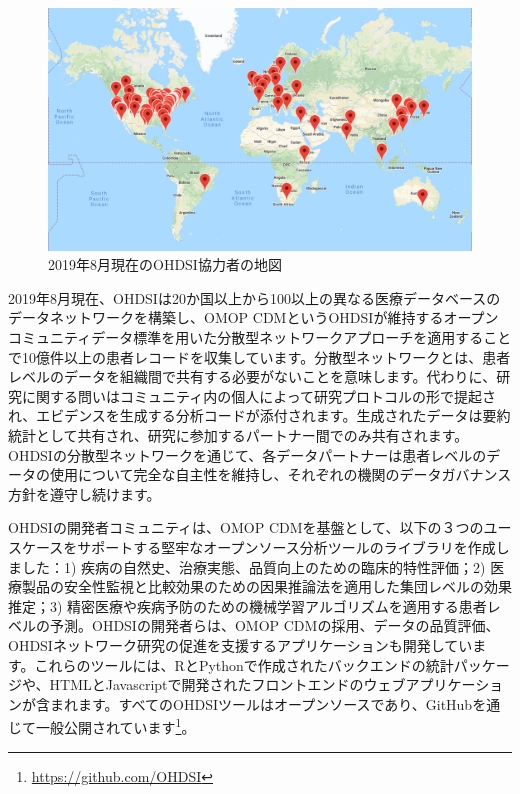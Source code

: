 \documentclass[
  11pt]{book}
\theoremstyle{definition}
\theoremstyle{definition}
\theoremstyle{definition}
\theoremstyle{definition}
\theoremstyle{remark}
\begin{document}
\begin{figure}

{\centering \includegraphics[width=1\linewidth]{images/OhdsiCommunity/mapOfCollaborators} 

}

\caption{2019年8月現在のOHDSI協力者の地図}\label{fig:collaboratormap}
\end{figure}

2019年8月現在、OHDSIは20か国以上から100以上の異なる医療データベースのデータネットワークを構築し、OMOP CDMというOHDSIが維持するオープンコミュニティデータ標準を用いた分散型ネットワークアプローチを適用することで10億件以上の患者レコードを収集しています。分散型ネットワークとは、患者レベルのデータを組織間で共有する必要がないことを意味します。代わりに、研究に関する問いはコミュニティ内の個人によって研究プロトコルの形で提起され、エビデンスを生成する分析コードが添付されます。生成されたデータは要約統計として共有され、研究に参加するパートナー間でのみ共有されます。OHDSIの分散型ネットワークを通じて、各データパートナーは患者レベルのデータの使用について完全な自主性を維持し、それぞれの機関のデータガバナンス方針を遵守し続けます。

OHDSIの開発者コミュニティは、OMOP CDMを基盤として、以下の３つのユースケースをサポートする堅牢なオープンソース分析ツールのライブラリを作成しました：1) 疾病の自然史、治療実態、品質向上のための臨床的特性評価；2) 医療製品の安全性監視と比較効果のための因果推論法を適用した集団レベルの効果推定；3) 精密医療や疾病予防のための機械学習アルゴリズムを適用する患者レベルの予測。OHDSIの開発者らは、OMOP CDMの採用、データの品質評価、OHDSIネットワーク研究の促進を支援するアプリケーションも開発しています。これらのツールには、RとPythonで作成されたバックエンドの統計パッケージや、HTMLとJavascriptで開発されたフロントエンドのウェブアプリケーションが含まれます。すべてのOHDSIツールはオープンソースであり、GitHubを通じて一般公開されています\footnote{\url{https://github.com/OHDSI}}。
\end{document}
